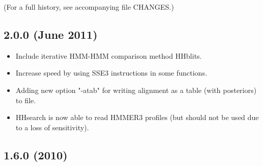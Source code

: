 \documentclass[11pt,a4paper]{article}
\begin{document}
(For a full history, see accompanying file CHANGES.)

\subsection{2.0.0 (June 2011)}

\begin{itemize}

\item{Include iterative HMM-HMM comparison method HHblits.
}

\item{Increase speed by using SSE3 instructions in some functions.
}

\item{Adding new option "-atab" for writing alignment as a table (with posteriors) to file.
}

\item{HHsearch is now able to read HMMER3 profiles (but should not be used due to a loss of sensitivity).
}

\end{itemize}


\subsection{1.6.0 (2010)}
\end{document}
